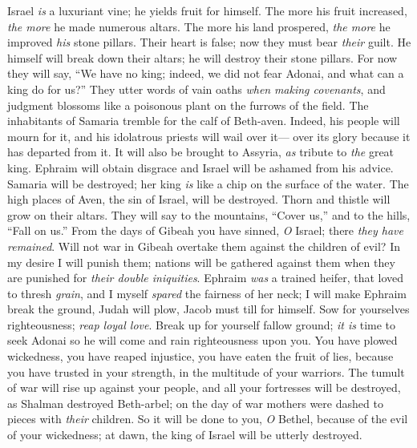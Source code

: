 \begin{biblechapter} %
 Israel \textit{is} a luxuriant vine; 
he yields fruit for himself. 
The more his fruit increased, 
\textit{the more} he made numerous altars. 
The more his land prospered, 
\textit{the more} he improved \textit{his} stone pillars.
\verse Their heart is false; 
now they must bear \textit{their} guilt. 
He himself will break down their altars; 
he will destroy their stone pillars.
\verse For now they will say, 
“We have no king; 
indeed, we did not fear Adonai, 
and what can a king do for us?”
\verse They utter words of vain oaths 
\textit{when} \textit{making covenants}, 
and judgment blossoms like a poisonous plant 
on the furrows of the field.
\verse The inhabitants of Samaria tremble 
for the calf of Beth-aven. 
Indeed, his people will mourn for it, 
and his idolatrous priests will wail over it— 
over its glory because it has departed from it.
\verse It will also be brought to Assyria, 
\textit{as} tribute to \textit{the} great king. 
Ephraim will obtain disgrace 
and Israel will be ashamed from his advice.
\verse Samaria will be destroyed; 
her king \textit{is} like a chip on the surface of the water.
\verse The high places of Aven, 
the sin of Israel, will be destroyed. 
Thorn and thistle will grow 
on their altars. 
They will say to the mountains, “Cover us,” 
and to the hills, “Fall on us.”
\verse From the days of Gibeah you have sinned, \textit{O} Israel; 
there \textit{they have remained}. 
Will not war in Gibeah overtake them 
against the children of evil?
\verse In my desire I will punish them; 
nations will be gathered against them 
when they are punished for \textit{their double iniquities}.
\verse Ephraim \textit{was} a trained heifer, 
that loved to thresh \textit{grain}, 
and I myself \textit{spared} 
the fairness of her neck; 
I will make Ephraim break the ground, 
Judah will plow, 
Jacob must till for himself.
\verse Sow for yourselves righteousness; 
\textit{reap loyal love}. 
Break up for yourself fallow ground; 
\textit{it is} time to seek Adonai 
so he will come and rain 
righteousness upon you.
\verse You have plowed wickedness, 
you have reaped injustice, 
you have eaten the fruit of lies, 
because you have trusted in your strength, 
in the multitude of your warriors.
\verse The tumult of war will rise up against your people, 
and all your fortresses will be destroyed, 
as Shalman destroyed Beth-arbel; 
on the day of war 
mothers were dashed to pieces with \textit{their} children.
\verse So it will be done to you, \textit{O} Bethel, 
because of the evil of your wickedness; 
at dawn, the king of Israel 
will be utterly destroyed.
\end{biblechapter}

